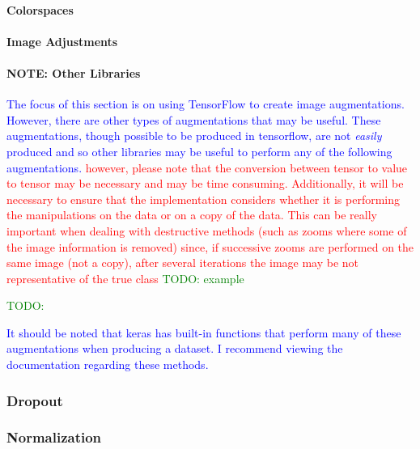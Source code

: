 
\paragraph{Colorspaces}


\paragraph{Image Adjustments}


\paragraph{NOTE: Other Libraries}

\textcolor{blue}{The focus of this section is on using TensorFlow to create image augmentations. However, there are other types of augmentations that may be useful. These augmentations, though possible to be produced in tensorflow, are not \textit{easily} produced and so other libraries may be useful to perform any of the following augmentations. \textcolor{red}{however, please note that the conversion between tensor to value to tensor may be necessary and may be time consuming. Additionally, it will be necessary to ensure that the implementation considers whether it is performing the manipulations on the data or on a copy of the data. This can be really important when dealing with destructive methods (such as zooms where some of the image information is removed) since, if successive zooms are performed on the same image (not a copy), after several iterations the image may be not representative of the true class \textcolor{green}{TODO: example}}}

\textcolor{green}{TODO:}

\textcolor{blue}{It should be noted that keras has built-in functions that perform many of these augmentations when producing a dataset. I recommend viewing the documentation regarding these methods.}

\subsubsection{Dropout}



\subsubsection{Normalization}

